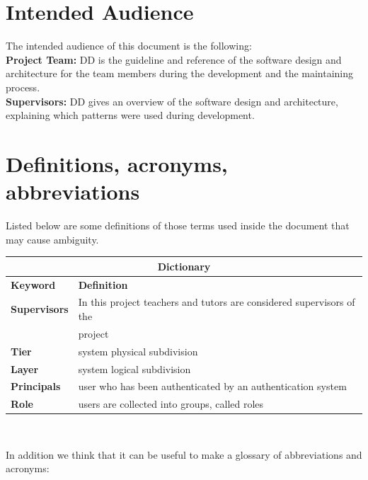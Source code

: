 \documentclass[12pt]{book}
\begin{document}
\section{Intended Audience}
The intended audience of this document is the following: \\

\textbf{Project Team: } DD is the guideline and reference of the software design and architecture  for the team members during the development and the maintaining process. \\

\textbf{Supervisors: } DD gives an overview of the software design and architecture, explaining which patterns were used during development. 

\section{Definitions, acronyms, abbreviations}
Listed below are some definitions of those terms used inside the document that may cause ambiguity. \\ \medskip

\begin{tabular}{ |l|l| }
  \hline
  \hline
  \multicolumn{2}{|c|}{\large{\textbf{Dictionary}}} \\
  \hline
  \hline
  \textbf{Keyword} & \textbf{Definition} \\
  \hline
  \textbf{Supervisors} & In this project teachers and tutors are considered supervisors of the \\&project\\
  \textbf{Tier} & system physical subdivision\\
  \textbf{Layer} & system logical subdivision\\
  \textbf{Principals} & user who has been authenticated by an authentication system\\
  \textbf{Role} & users are collected into groups, called roles\\

  \hline
  \hline
\end{tabular} \\ 
\vspace{0.5cm}

In addition we think that it can be useful to make a glossary of abbreviations and acronyms:  \\ \medskip
\end{document}

